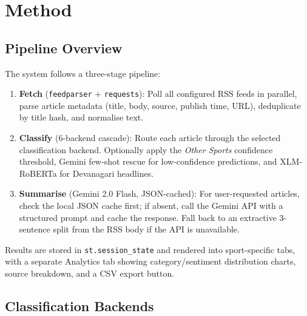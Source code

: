 \documentclass[11pt,a4paper]{article}
\begin{document}
\section{Method}

\subsection{Pipeline Overview}

The system follows a three-stage pipeline:

\begin{enumerate}[noitemsep,leftmargin=*]
  \item \textbf{Fetch} (\texttt{feedparser} + \texttt{requests}): Poll all configured RSS feeds in parallel, parse article metadata (title, body, source, publish time, URL), deduplicate by title hash, and normalise text.
  \item \textbf{Classify} (6-backend cascade): Route each article through the selected classification backend. Optionally apply the \textit{Other Sports} confidence threshold, Gemini few-shot rescue for low-confidence predictions, and XLM-RoBERTa for Devanagari headlines.
  \item \textbf{Summarise} (Gemini 2.0 Flash, JSON-cached): For user-requested articles, check the local JSON cache first; if absent, call the Gemini API with a structured prompt and cache the response. Fall back to an extractive 3-sentence split from the RSS body if the API is unavailable.
\end{enumerate}

Results are stored in \texttt{st.session\_state} and rendered into sport-specific tabs, with a separate Analytics tab showing category/sentiment distribution charts, source breakdown, and a CSV export button.

\subsection{Classification Backends}
\end{document}
